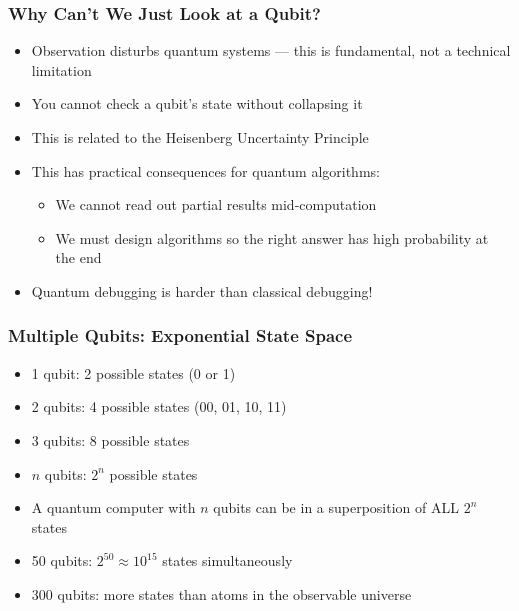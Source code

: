 \begin{frame}[fragile]\frametitle{Why Can't We Just Look at a Qubit?}
\begin{itemize}
\item Observation disturbs quantum systems --- this is fundamental, not a technical limitation
\item You cannot check a qubit's state without collapsing it
\item This is related to the Heisenberg Uncertainty Principle
\item This has practical consequences for quantum algorithms:
  \begin{itemize}
  \item We cannot read out partial results mid-computation
  \item We must design algorithms so the right answer has high probability at the end
  \end{itemize}
\item Quantum debugging is harder than classical debugging!
\end{itemize}
\end{frame}

\begin{frame}[fragile]\frametitle{Multiple Qubits: Exponential State Space}
\begin{itemize}
\item 1 qubit: 2 possible states (0 or 1)
\item 2 qubits: 4 possible states (00, 01, 10, 11)
\item 3 qubits: 8 possible states
\item $n$ qubits: $2^n$ possible states
\item A quantum computer with $n$ qubits can be in a superposition of ALL $2^n$ states
\item 50 qubits: $2^{50} \approx 10^{15}$ states simultaneously
\item 300 qubits: more states than atoms in the observable universe
\end{itemize}
\end{frame}

